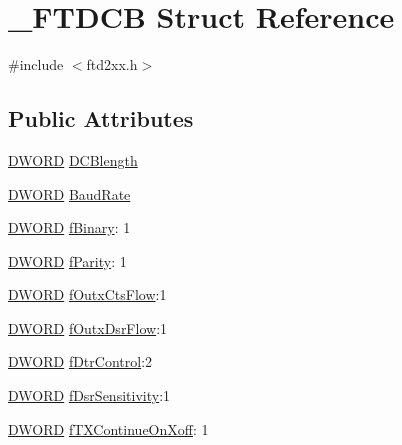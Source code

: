 \hypertarget{struct__FTDCB}{}\section{\+\_\+\+F\+T\+D\+CB Struct Reference}
\label{struct__FTDCB}


{\ttfamily \#include $<$ftd2xx.\+h$>$}

\subsection*{Public Attributes}
\begin{DoxyCompactItemize}
\item 
\hyperlink{CatCaloProto40MHz_2inc_2WinTypes_8h_ad342ac907eb044443153a22f964bf0af}{D\+W\+O\+RD} \hyperlink{struct__FTDCB_a0d577b6cc351abc8313fd7eeaf7a4468}{D\+C\+Blength}
\item 
\hyperlink{CatCaloProto40MHz_2inc_2WinTypes_8h_ad342ac907eb044443153a22f964bf0af}{D\+W\+O\+RD} \hyperlink{struct__FTDCB_a3c59a8bdbb30e28505045b3186c89cbf}{Baud\+Rate}
\item 
\hyperlink{CatCaloProto40MHz_2inc_2WinTypes_8h_ad342ac907eb044443153a22f964bf0af}{D\+W\+O\+RD} \hyperlink{struct__FTDCB_a66a920f15680e8bc01bc4b9d7e1e442a}{f\+Binary}\+: 1
\item 
\hyperlink{CatCaloProto40MHz_2inc_2WinTypes_8h_ad342ac907eb044443153a22f964bf0af}{D\+W\+O\+RD} \hyperlink{struct__FTDCB_a8a81323a9b1ba34bd0cc2ae97d898c73}{f\+Parity}\+: 1
\item 
\hyperlink{CatCaloProto40MHz_2inc_2WinTypes_8h_ad342ac907eb044443153a22f964bf0af}{D\+W\+O\+RD} \hyperlink{struct__FTDCB_a3e5166713d0405820849e27ba554ba7d}{f\+Outx\+Cts\+Flow}\+:1
\item 
\hyperlink{CatCaloProto40MHz_2inc_2WinTypes_8h_ad342ac907eb044443153a22f964bf0af}{D\+W\+O\+RD} \hyperlink{struct__FTDCB_af5ce76c2d358a419e028f8879aca3dcb}{f\+Outx\+Dsr\+Flow}\+:1
\item 
\hyperlink{CatCaloProto40MHz_2inc_2WinTypes_8h_ad342ac907eb044443153a22f964bf0af}{D\+W\+O\+RD} \hyperlink{struct__FTDCB_a770cbe04afe4551d954b460e15bc253e}{f\+Dtr\+Control}\+:2
\item 
\hyperlink{CatCaloProto40MHz_2inc_2WinTypes_8h_ad342ac907eb044443153a22f964bf0af}{D\+W\+O\+RD} \hyperlink{struct__FTDCB_a18de82101e19a3c2be9226489e7df0b2}{f\+Dsr\+Sensitivity}\+:1
\item 
\hyperlink{CatCaloProto40MHz_2inc_2WinTypes_8h_ad342ac907eb044443153a22f964bf0af}{D\+W\+O\+RD} \hyperlink{struct__FTDCB_afa27d3f28cd9154df261cd643df33497}{f\+T\+X\+Continue\+On\+Xoff}\+: 1

\end{DoxyCompactItemize}
